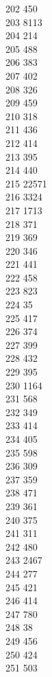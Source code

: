 { 202	450 \\
 203	8113 \\
 204	214 \\
 205	488 \\
 206	383 \\
 207	402 \\
 208	326 \\
 209	459 \\
 210	318 \\
 211	436 \\
 212	414 \\
 213	395 \\
 214	440 \\
 215	22571 \\
 216	3324 \\
 217	1713 \\
 218	371 \\
 219	369 \\
 220	346 \\
 221	441 \\
 222	458 \\
 223	823 \\
 224	35 \\
 225	417 \\
 226	374 \\
 227	399 \\
 228	432 \\
 229	395 \\
 230	1164 \\
 231	568 \\
 232	349 \\
 233	414 \\
 234	405 \\
 235	598 \\
 236	309 \\
 237	359 \\
 238	471 \\
 239	361 \\
 240	375 \\
 241	311 \\
 242	480 \\
 243	2467 \\
 244	277 \\
 245	421 \\
 246	414 \\
 247	780 \\
 248	38 \\
 249	456 \\
 250	424 \\
 251	503 \\
}
